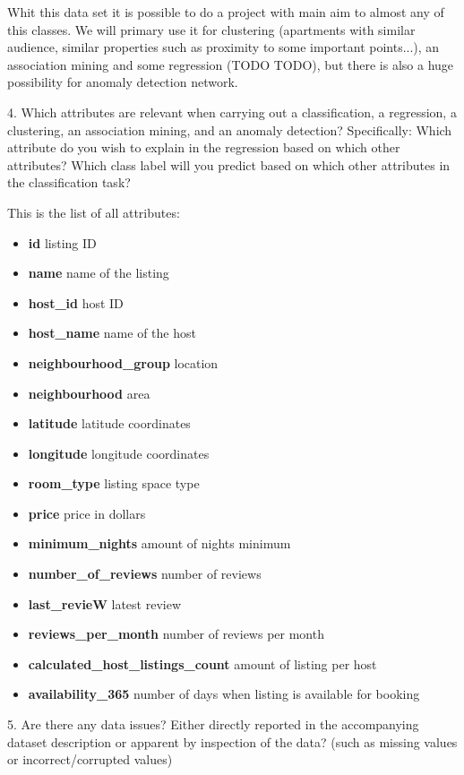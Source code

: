 \documentclass[]{report}
\begin{document}
Whit this data set it is possible to do a project with main aim to almost any of this classes. We will primary use it for clustering (apartments with similar audience, similar properties such as proximity to some important points...), an association mining and some regression (TODO TODO), but there is also a huge possibility for anomaly detection network.   

\hspace{1cm}
4. Which attributes are relevant when carrying out a classification, a regression, a clustering, an association mining, and an anomaly detection? Specifically: Which attribute do you wish to explain in the regression based on which other attributes? Which class label will you predict based on which other attributes in the classification task?

This is the list of all attributes:
\begin{itemize}
\item \textbf{id} listing ID
\item \textbf{name} name of the listing
\item \textbf{host\_id} host ID
\item \textbf{host\_name} name of the host
\item \textbf{neighbourhood\_group} location
\item \textbf{neighbourhood} area
\item \textbf{latitude} latitude coordinates
\item \textbf{longitude} longitude coordinates
\item \textbf{room\_type} listing space type
\item \textbf{price} price in dollars
\item \textbf{minimum\_nights} amount of nights minimum
\item \textbf{number\_of\_reviews} number of reviews
\item \textbf{last\_revieW} latest review
\item \textbf{reviews\_per\_month} number of reviews per month
\item \textbf{calculated\_host\_listings\_count} amount of listing per host
\item \textbf{availability\_365} number of days when listing is available for booking
\end{itemize}

\hspace{1cm}
5. Are there any data issues? Either directly reported in the accompanying dataset description or apparent by inspection of the data? (such as missing values or incorrect/corrupted values)
\end{document}
